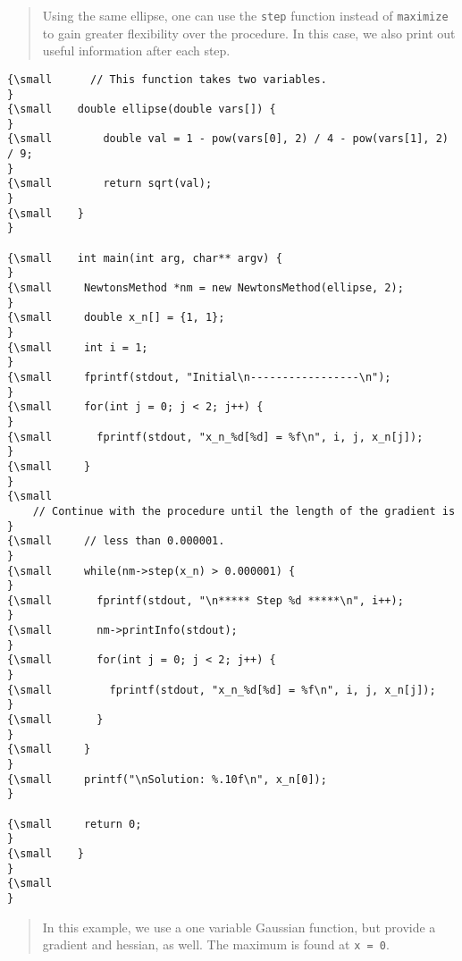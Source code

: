 \begin{quotation}
Using the same ellipse, one can use the \texttt{step} function instead of 
\texttt{maximize} to gain greater flexibility over the procedure. In this
case, we also print out useful information after each step.{\small }
\end{quotation}

\begin{verbatim}
{\small      // This function takes two variables.
}
{\small    double ellipse(double vars[]) {
}
{\small        double val = 1 - pow(vars[0], 2) / 4 - pow(vars[1], 2) / 9;
}
{\small        return sqrt(val);
}
{\small    }
}
 
{\small    int main(int arg, char** argv) {
}
{\small     NewtonsMethod *nm = new NewtonsMethod(ellipse, 2);
}
{\small     double x_n[] = {1, 1};
}
{\small     int i = 1;
}
{\small     fprintf(stdout, "Initial\n-----------------\n");
}
{\small     for(int j = 0; j < 2; j++) {
}
{\small       fprintf(stdout, "x_n_%d[%d] = %f\n", i, j, x_n[j]);
}
{\small     }
}
{\small 
    // Continue with the procedure until the length of the gradient is 
}
{\small     // less than 0.000001.
}
{\small     while(nm->step(x_n) > 0.000001) {
}
{\small       fprintf(stdout, "\n***** Step %d *****\n", i++);
}
{\small       nm->printInfo(stdout);
}
{\small       for(int j = 0; j < 2; j++) {
}
{\small         fprintf(stdout, "x_n_%d[%d] = %f\n", i, j, x_n[j]);
}
{\small       }
}
{\small     }
}
{\small     printf("\nSolution: %.10f\n", x_n[0]);
}
 
{\small     return 0;
}
{\small    }
}
{\small   
}
\end{verbatim}

\begin{quotation}
In this example, we use a one variable Gaussian function, but provide a
gradient and hessian, as well. The maximum is found at \texttt{x = 0}.%
{\small }
\end{quotation}


